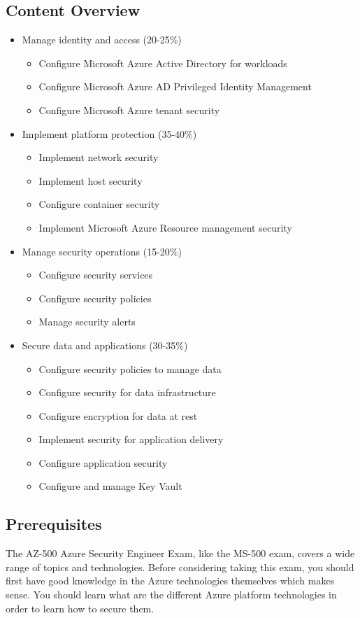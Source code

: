 \subsection{Content Overview}
\begin{itemize}
\item Manage identity and access (20-25\%)
	\begin{itemize}
	\item Configure Microsoft Azure Active Directory for workloads
	\item Configure Microsoft Azure AD Privileged Identity Management
	\item Configure Microsoft Azure tenant security
	\end{itemize}
\item Implement platform protection (35-40\%)
	\begin{itemize}
	\item Implement network security
	\item Implement host security
	\item Configure container security
	\item Implement Microsoft Azure Resource management security
	\end{itemize}
\item Manage security operations (15-20\%)
	\begin{itemize}
	\item Configure security services
	\item Configure security policies
	\item Manage security alerts
	\end{itemize}
\item Secure data and applications (30-35\%)
	\begin{itemize}
	\item Configure security policies to manage data
	\item Configure security for data infrastructure
	\item Configure encryption for data at rest
	\item Implement security for application delivery
	\item Configure application security
	\item Configure and manage Key Vault
	\end{itemize}
\end{itemize}

\clearpage
\subsection{Prerequisites}
The AZ-500 Azure Security Engineer Exam, like the MS-500 exam, covers a wide range of topics and technologies. Before considering taking this exam, you should first have good knowledge in the Azure technologies themselves which makes sense. You should learn what are the different Azure platform technologies in order to learn how to secure them.

